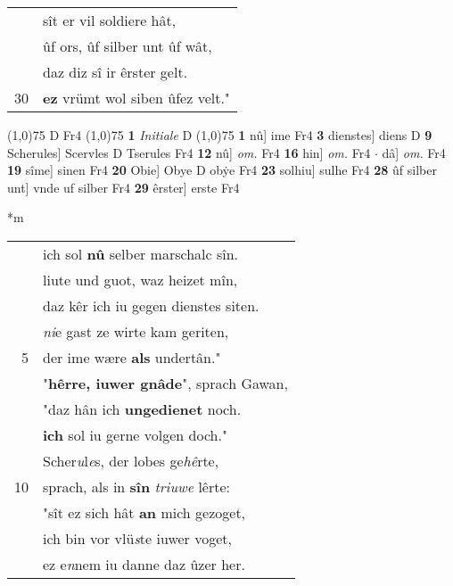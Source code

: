 \documentclass[8pt,a4paper,notitlepage]{article}
\begin{document}
\begin{table}[ht]
\begin{minipage}[t]{0.5\linewidth}
\begin{tabular}{rl}
 & sît er vil soldiere hât,\\ 
 & ûf ors, ûf silber unt ûf wât,\\ 
 & daz diz sî ir êrster gelt.\\ 
30 & \textbf{ez} vrümt wol siben ûfez velt."\\ 
\end{tabular}
\scriptsize
\line(1,0){75} \newline
D Fr4 \newline
\line(1,0){75} \newline
\textbf{1} \textit{Initiale} D  \newline
\line(1,0){75} \newline
\textbf{1} nû] ime Fr4 \textbf{3} dienstes] diens D \textbf{9} Scherules] Scervles D Tserules Fr4 \textbf{12} nû] \textit{om.} Fr4 \textbf{16} hin] \textit{om.} Fr4  $\cdot$ dâ] \textit{om.} Fr4 \textbf{19} sîme] sinen Fr4 \textbf{20} Obie] Obye D obẏe Fr4 \textbf{23} solhiu] sulhe Fr4 \textbf{28} ûf silber unt] vnde uf silber Fr4 \textbf{29} êrster] erste Fr4 \newline
\end{minipage}
\hspace{0.5cm}
\begin{minipage}[t]{0.5\linewidth}
\small
\begin{center}*m
\end{center}
\begin{tabular}{rl}
 & ich sol \textbf{nû} selber marschalc sîn.\\ 
 & liute und guot, waz heizet mîn,\\ 
 & daz kêr ich iu gegen dienstes siten.\\ 
 & \textit{ni}e gast ze wirte kam geriten,\\ 
5 & der ime wære \textbf{als} undertân."\\ 
 & "\textbf{hêrre, iuwer gnâde}", sprach Gawan,\\ 
 & "daz hân ich \textbf{ungedienet} noch.\\ 
 & \textbf{ich} sol iu gerne volgen doch."\\ 
 & Scher\textit{u}l\textit{e}s, der lobes ge\textit{hê}rte,\\ 
10 & sprach, als in \textbf{sîn} \textit{triuwe} lêrte:\\ 
 & "sît ez sich hât \textbf{an} mich gezoget,\\ 
 & ich bin vor vlü\textit{s}te iuwer voget,\\ 
 & ez e\textit{n}nem iu danne daz ûzer her.\\ 

\end{tabular}
\end{minipage}
\end{table}
\end{document}
